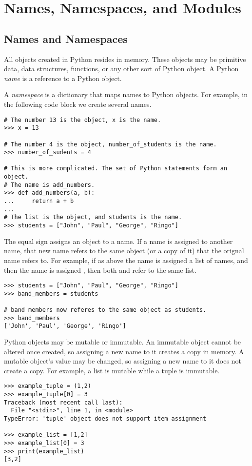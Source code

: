 \section*{Names, Namespaces, and Modules}

\subsection*{Names and Namespaces}
All objects created in Python resides in memory.
These objects may be primitive data, data structures, functions, or any other sort of Python object.
A Python \emph{name} is a reference to a Python object.

A \emph{namespace} is a dictionary that maps names to Python objects.
For example, in the following code block we create several names.

\begin{lstlisting}
# The number 13 is the object, x is the name.
>>> x = 13

# The number 4 is the object, number_of_students is the name.
>>> number_of_sudents = 4

# This is more complicated. The set of Python statements form an object.
# The name is add_numbers.
>>> def add_numbers(a, b):
...     return a + b
... 
# The list is the object, and students is the name.
>>> students = ["John", "Paul", "George", "Ringo"]
\end{lstlisting}

The equal sign assigns an object to a name.
If a name is assigned to another name, that new name refers to the same object (or a copy of it) that the orignal name refers to.
For example, if as above the name  is assigned a list of names, and then the name  is assigned , then both  and  refer to the same list.

\begin{lstlisting}
>>> students = ["John", "Paul", "George", "Ringo"]
>>> band_members = students

# band_members now referes to the same object as students.
>>> band_members
['John', 'Paul', 'George', 'Ringo']
\end{lstlisting}

Python objects may be mutable or immutable.
An immutable object cannot be altered once created, so assigning a new name to it creates a copy in memory.
A mutable object's value may be changed, so assigning a new name to it does not create a copy.
For example, a list is mutable while a tuple is immutable.
\begin{lstlisting}
>>> example_tuple = (1,2)
>>> example_tuple[0] = 3
Traceback (most recent call last):
  File "<stdin>", line 1, in <module>
TypeError: 'tuple' object does not support item assignment

>>> example_list = [1,2]
>>> example_list[0] = 3
>>> print(example_list)
[3,2]
\end{lstlisting}

